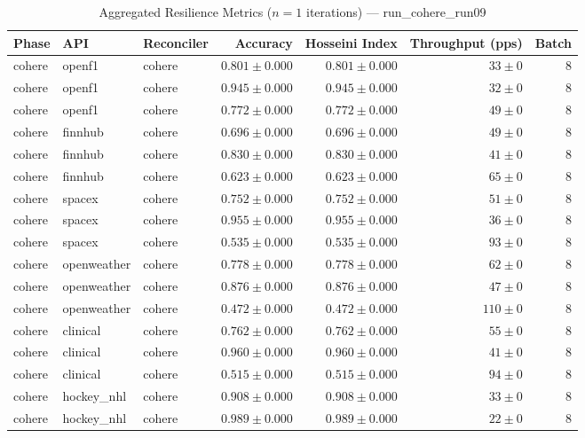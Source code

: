 
\begin{table}[htbp]
\caption{Aggregated Resilience Metrics ($n=1$ iterations) --- run_cohere_run09}
\begin{tabular}{l l l r r r r}
\hline
Phase & API & Reconciler & Accuracy & Hosseini Index & Throughput (pps) & Batch \\
\hline
cohere & openf1 & cohere & $0.801\pm0.000$ & $0.801\pm0.000$ & $33\pm0$ & 8 \\
cohere & openf1 & cohere & $0.945\pm0.000$ & $0.945\pm0.000$ & $32\pm0$ & 8 \\
cohere & openf1 & cohere & $0.772\pm0.000$ & $0.772\pm0.000$ & $49\pm0$ & 8 \\
cohere & finnhub & cohere & $0.696\pm0.000$ & $0.696\pm0.000$ & $49\pm0$ & 8 \\
cohere & finnhub & cohere & $0.830\pm0.000$ & $0.830\pm0.000$ & $41\pm0$ & 8 \\
cohere & finnhub & cohere & $0.623\pm0.000$ & $0.623\pm0.000$ & $65\pm0$ & 8 \\
cohere & spacex & cohere & $0.752\pm0.000$ & $0.752\pm0.000$ & $51\pm0$ & 8 \\
cohere & spacex & cohere & $0.955\pm0.000$ & $0.955\pm0.000$ & $36\pm0$ & 8 \\
cohere & spacex & cohere & $0.535\pm0.000$ & $0.535\pm0.000$ & $93\pm0$ & 8 \\
cohere & openweather & cohere & $0.778\pm0.000$ & $0.778\pm0.000$ & $62\pm0$ & 8 \\
cohere & openweather & cohere & $0.876\pm0.000$ & $0.876\pm0.000$ & $47\pm0$ & 8 \\
cohere & openweather & cohere & $0.472\pm0.000$ & $0.472\pm0.000$ & $110\pm0$ & 8 \\
cohere & clinical & cohere & $0.762\pm0.000$ & $0.762\pm0.000$ & $55\pm0$ & 8 \\
cohere & clinical & cohere & $0.960\pm0.000$ & $0.960\pm0.000$ & $41\pm0$ & 8 \\
cohere & clinical & cohere & $0.515\pm0.000$ & $0.515\pm0.000$ & $94\pm0$ & 8 \\
cohere & hockey\_nhl & cohere & $0.908\pm0.000$ & $0.908\pm0.000$ & $33\pm0$ & 8 \\
cohere & hockey\_nhl & cohere & $0.989\pm0.000$ & $0.989\pm0.000$ & $22\pm0$ & 8 \\

\end{tabular}
\end{table}

